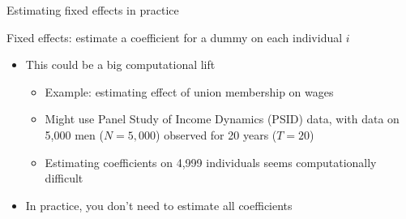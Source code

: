 \documentclass[compress, 8pt]{beamer}
\begin{document}
\begin{frame}{Estimating fixed effects in practice}

Fixed effects: estimate a coefficient for a dummy on each individual $i$
\begin{itemize}
    \item This could be a big computational lift
    \begin{itemize}
        \item Example: estimating effect of union membership on wages
        \item Might use Panel Study of Income Dynamics (PSID) data, with data on 5,000 men ($N=5,000$) observed for 20 years ($T=20$)
        \item Estimating coefficients on 4,999 individuals seems computationally difficult
    \end{itemize}
    \item In practice, you don't need to estimate all coefficients
\end{itemize}

\end{frame}
\end{document}
